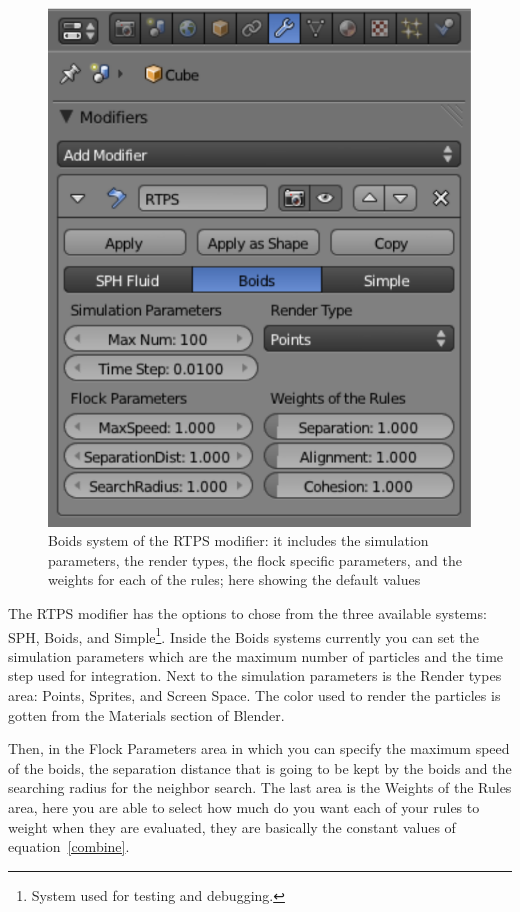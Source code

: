 \begin{figure}[htbp]
\begin{center}
\includegraphics[scale=0.8]{figures/modifier.pdf}
\caption{Boids system of the RTPS modifier: it includes the simulation parameters, the render types, the flock specific parameters, and the weights for each of the rules; here showing the default values}
\label{ui}
\end{center}
\end{figure}

The RTPS modifier has the options to chose from the three available systems: SPH, Boids, and Simple\footnote{System used for testing and debugging.}. Inside the Boids systems currently you can set the simulation parameters which are the maximum number of particles and the time step used for integration.  Next to the simulation parameters is the Render types area: Points, Sprites, and Screen Space. The color used to render the particles is gotten from the Materials section of Blender.

Then, in the Flock Parameters area in which you can specify the maximum speed of the boids, the separation distance that is going to be kept by the boids and the searching radius for the neighbor search. The last area is the Weights of the Rules area, here you are able to select how much do you want each of your rules to weight when they are evaluated, they are basically the constant values of equation~\ref{combine}.

